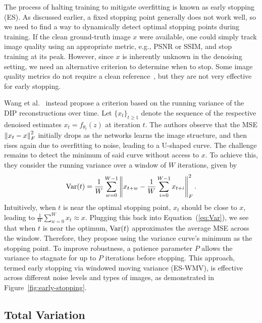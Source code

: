 The process of halting training to mitigate overfitting is known as early stopping (ES).
As discussed earlier, a fixed stopping point generally does not work well, so we need to find a way to dynamically detect optimal stopping points during training.
If the clean ground-truth image $x$ were available, one could simply track image quality using an appropriate metric, e.g., PSNR or SSIM, and stop training at its peak.
However, since $x$ is inherently unknown in the denoising setting, we need an alternative criterion to determine when to stop.
Some image quality metrics do not require a clean reference~\cite{BRISQUE}, but they are not very effective for early stopping.

Wang et al.~\cite{ES} instead propose a criterion based on the running variance of the DIP reconstructions over time.
Let $\{x_t\}_{t \geq 1}$ denote the sequence of the respective denoised estimates $x_t = f_{\theta_t}(z)$ at iteration $t$.
The authors observe that the MSE $\left\lVert x_t-x\right\rVert_F^2$ initially drops as the networks learns the image structure, and then rises again due to overfitting to noise, leading to a U-shaped curve.
The challenge remains to detect the minimum of said curve without access to $x$.
To achieve this, they consider the running variance over a window of $W$ iterations, given by
\begin{equation}\label{eq:Var}
    \operatorname{Var}(t) = \frac{1}{W} \sum_{w=0}^{W-1} \left\lVert x_{t+w}-\frac{1}{W} \sum_{i=0}^{W-1} x_{t+i}\right\rVert_F^2.
\end{equation}
Intuitively, when $t$ is near the optimal stopping point, $x_t$ should be close to $x$, leading to $\frac{1}{W} \sum_{w=0}^{W} x_t \approx x$.
Plugging this back into Equation~(\ref{eq:Var}), we see that when $t$ is near the optimum, $\operatorname{Var}(t)$ approximates the average MSE across the window.
Therefore, they propose using the variance curve's minimum as the stopping point.
To improve robustness, a patience parameter $P$ allows the variance to stagnate for up to $P$ iterations before stopping.
This approach, termed early stopping via windowed moving variance (ES-WMV), is effective across different noise levels and types of images, as demonstrated in Figure~\ref{fig:early-stopping}. 

\subsection{Total Variation}

